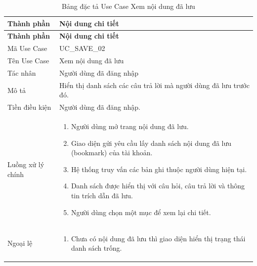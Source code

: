 \documentclass[12pt,a4paper,oneside]{report}
\begin{document}
{
  \begin{longtable}{|L{3.6cm}|L{11.2cm}|}
    \caption{Bảng đặc tả Use Case Xem nội dung đã lưu}\label{tab:uc-saved-list}                                       \\
    \hline
    \textbf{Thành phần} & \textbf{Nội dung chi tiết}                                                                    \\
    \hline
    \endfirsthead
    \hline
    \textbf{Thành phần} & \textbf{Nội dung chi tiết}                                                                    \\
    \hline
    \endhead
    Mã Use Case       & UC\_SAVE\_02                                                                                  \\
    \hline
    Tên Use Case      & Xem nội dung đã lưu                                                                           \\
    \hline
    Tác nhân            & Người dùng đã đăng nhập                                                                       \\
    \hline
    Mô tả               & Hiển thị danh sách các câu trả lời mà người dùng đã lưu trước đó.                             \\
    \hline
    Tiền điều kiện      & Người dùng đã đăng nhập.                                                                      \\
    \hline
    Luồng xử lý chính   & \begin{enumerate}[leftmargin=*,nosep]
                            \item Người dùng mở trang nội dung đã lưu.
                            \item Giao diện gửi yêu cầu lấy danh sách nội dung đã lưu (bookmark) của tài khoản.
                            \item Hệ thống truy vấn các bản ghi thuộc người dùng hiện tại.
                            \item Danh sách được hiển thị với câu hỏi, câu trả lời và thông tin trích dẫn đã lưu.
                            \item Người dùng chọn một mục để xem lại chi tiết.
                          \end{enumerate}          \\
    \hline
    Ngoại lệ            & \begin{enumerate}[leftmargin=*,nosep]
                            \item Chưa có nội dung đã lưu thì giao diện hiển thị trạng thái danh sách trống.

\end{enumerate}
\end{longtable}}
\end{document}
